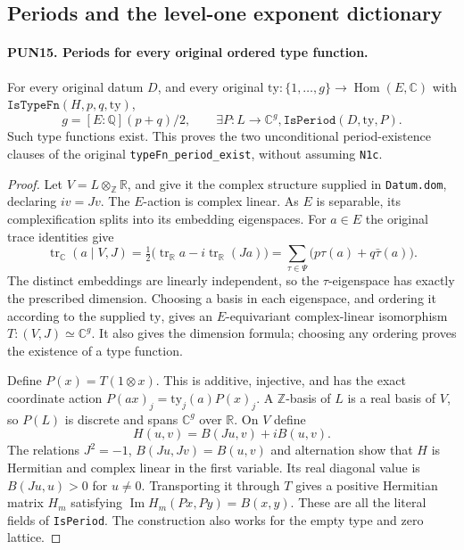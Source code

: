 \subsection{Periods and the level-one exponent dictionary}

\paragraph{PUN15. Periods for every original ordered type function.}
\label{claim:PUN15}
For every original datum \(D\), and every original
\(\mathrm{ty}:\{1,\ldots,g\}\to\operatorname{Hom}(E,\mathbb C)\)
with \(\texttt{IsTypeFn}(H,p,q,\mathrm{ty})\),
\[
 g=[E:\mathbb Q](p+q)/2,
 \qquad \exists P:L\longrightarrow\mathbb C^g,
                           \texttt{IsPeriod}(D,\mathrm{ty},P).
 \tag{PUN.16}
\]
Such type functions exist.  This proves the two unconditional
period-existence clauses of the original
\texttt{typeFn\_period\_exist}, without assuming \texttt{N1c}.

\begin{proof}
Let \(V=L\otimes_{\mathbb Z}\mathbb R\), and give it the
complex structure supplied in \texttt{Datum.dom}, declaring
\(i v=Jv\).  The \(E\)-action is complex linear.  As \(E\)
is separable, its complexification splits into its embedding
eigenspaces.  For \(a\in E\) the original trace identities
give
\[
 \operatorname{tr}_{\mathbb C}(a\mid V,J)
 =\tfrac12\bigl(\operatorname{tr}_{\mathbb R}a
                  -i\operatorname{tr}_{\mathbb R}(Ja)\bigr)
 =\sum_{\tau\in\Psi}
                       \bigl(p\tau(a)+q\bar\tau(a)\bigr).
 \tag{PUN.17}
\]
The distinct embeddings are linearly independent, so the
\(\tau\)-eigenspace has exactly the prescribed dimension.
Choosing a basis in each eigenspace, and ordering it according
to the supplied \(\mathrm{ty}\), gives an \(E\)-equivariant
complex-linear isomorphism \(T:(V,J)\simeq\mathbb C^g\).
It also gives the dimension formula; choosing any ordering
proves the existence of a type function.

Define \(P(x)=T(1\otimes x)\).  This is additive, injective,
and has the exact coordinate action
\(P(ax)_j=\mathrm{ty}_j(a)P(x)_j\).  A \(\mathbb Z\)-basis
of \(L\) is a real basis of \(V\), so \(P(L)\) is discrete
and spans \(\mathbb C^g\) over \(\mathbb R\).
On \(V\) define
\[
                 H(u,v)=B(Ju,v)+iB(u,v).
 \tag{PUN.18}
\]
The relations \(J^2=-1\), \(B(Ju,Jv)=B(u,v)\) and
alternation show that \(H\) is Hermitian and complex linear
in the first variable.  Its real diagonal value is
\(B(Ju,u)>0\) for \(u\ne0\).  Transporting it through \(T\)
gives a positive Hermitian matrix \(H_m\) satisfying
\(\operatorname{Im}H_m(Px,Py)=B(x,y)\).  These are all the
literal fields of \texttt{IsPeriod}.  The construction also
works for the empty type and zero lattice.
\end{proof}

